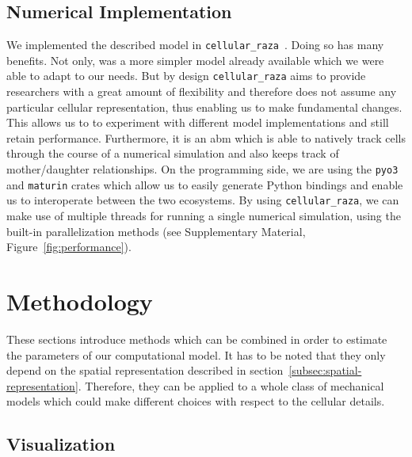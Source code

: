 \documentclass{article}
\begin{document}
\subsection{Numerical Implementation}

We implemented the described model in \texttt{cellular\_raza}~\cite{Pleyer2025}.
Doing so has many benefits.
Not only, was a more simpler model already available which we were able to adapt to our needs.
But by design \texttt{cellular\_raza} aims to provide researchers with a great amount of flexibility
and therefore does not assume any particular cellular representation, thus enabling us to make
fundamental changes.
This allows us to to experiment with different model implementations and still retain performance.
Furthermore, it is an \ac{abm} which is able to natively track cells through the course of a
numerical simulation and also keeps track of mother/daughter relationships.
On the programming side, we are using the \texttt{pyo3} and \texttt{maturin} crates which allow us
to easily generate Python bindings and enable us to interoperate between the two ecosystems.
By using \texttt{cellular\_raza}, we can make use of multiple threads for running a single numerical
simulation, using the built-in parallelization methods (see Supplementary Material,
Figure~\ref{fig:performance}).

\section{Methodology}
These sections introduce methods which can be combined in order to estimate the parameters of our
computational model.
It has to be noted that they only depend on the spatial representation described in
section~\ref{subsec:spatial-representation}.
Therefore, they can be applied to a whole class of mechanical models which could make different
choices with respect to the cellular details.

\subsection{Visualization}
\label{subsection:visualization}
\end{document}
